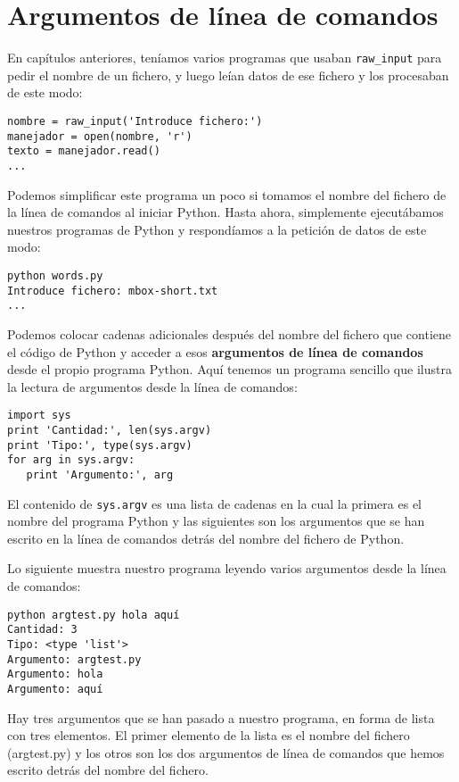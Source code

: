 \section{Argumentos de línea de comandos}


En capítulos anteriores, teníamos varios programas que usaban
\verb"raw_input" para pedir el nombre de un fichero, y luego leían datos
de ese fichero y los procesaban de este modo:

\beforeverb
\begin{verbatim}
nombre = raw_input('Introduce fichero:')
manejador = open(nombre, 'r')
texto = manejador.read()
...
\end{verbatim}
\afterverb
%
Podemos simplificar este programa un poco si tomamos el nombre del fichero
de la línea de comandos al iniciar Python. Hasta ahora,
simplemente ejecutábamos nuestros programas de Python y respondíamos
a la petición de datos de este modo:

\beforeverb
\begin{verbatim}
python words.py
Introduce fichero: mbox-short.txt
...
\end{verbatim}
\afterverb
%
Podemos colocar cadenas adicionales después del nombre del fichero que contiene el código de Python y
acceder a esos {\bf argumentos de línea de comandos} desde el propio programa Python.
Aquí tenemos un programa sencillo que ilustra la lectura de argumentos desde la línea de
comandos:

\beforeverb
\begin{verbatim}
import sys
print 'Cantidad:', len(sys.argv)
print 'Tipo:', type(sys.argv)
for arg in sys.argv:
   print 'Argumento:', arg
\end{verbatim}
\afterverb
%
El contenido de {\tt sys.argv} es una lista de cadenas en la cual la primera
es el nombre del programa Python y las siguientes son los argumentos que se han
escrito en la línea de comandos detrás del nombre del fichero de Python.

Lo siguiente muestra nuestro programa leyendo varios argumentos desde la línea de
comandos:

\beforeverb
\begin{verbatim}
python argtest.py hola aquí
Cantidad: 3
Tipo: <type 'list'>
Argumento: argtest.py
Argumento: hola
Argumento: aquí
\end{verbatim}
\afterverb
%
Hay tres argumentos que se han pasado a nuestro programa, en forma de lista con tres elementos.
El primer elemento de la lista es el nombre del fichero (argtest.py) y los otros son
los dos argumentos de línea de comandos que hemos escrito detrás del nombre del fichero.

